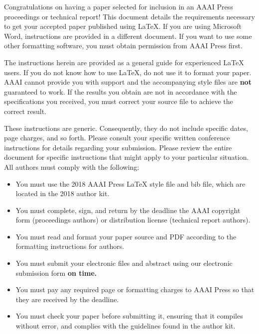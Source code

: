 \documentclass[letterpaper]{article} %
\begin{document}
\noindent Congratulations on having a paper selected for inclusion in an AAAI Press proceedings or technical report! This document details the requirements necessary to get your accepted paper published using \LaTeX{}. If you are using Microsoft Word, instructions are provided in a different document. If you want to use some other formatting software, you must obtain permission from AAAI Press first. 

The instructions herein are provided as a general guide for experienced \LaTeX{} users. If you do not know how to use \LaTeX{}, do not use it to format your paper. AAAI cannot provide you with support and the accompanying style files are \textbf{not} guaranteed to work. If the results you obtain are not in accordance with the specifications you received, you must correct your source file to achieve the correct result. 

These instructions are generic. Consequently, they do not include specific dates, page charges, and so forth. Please consult your specific written conference instructions for details regarding your submission. Please review the entire document for specific instructions that might apply to your particular situation. All authors must comply with the following:

\begin{itemize}
\item You must use the 2018 AAAI Press \LaTeX{} style file and bib file, which are located in the 2018 author kit.
\item You must complete, sign, and return by the deadline the AAAI copyright form (proceedings authors) or distribution license (technical report authors).
\item You must read and format your paper source and PDF according to the formatting instructions for authors.
\item You must submit your electronic files and abstract using our electronic submission form \textbf{on time.}
\item You must pay any required page or formatting charges to AAAI Press so that they are received by the deadline.
\item You must check your paper before submitting it, ensuring that it compiles without error, and complies with the guidelines found in the author kit.
\end{itemize}
\end{document}
